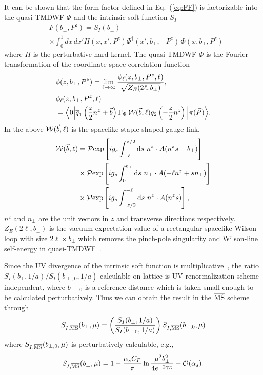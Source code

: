 It can be shown that the form factor defined in Eq.~(\ref{eq:FF}) is factorizable into the quasi-TMDWF $\Phi$ and the intrinsic soft function $S_I$~\cite{Ji:2019sxk,Ji:2020ect}
%
\begin{align}\label{eq:FF_factorization}
&F(b_\perp,P^z)= {S_I(b_\perp)}\\ &\times {\int_0^1 dx\, dx' H(x,x',P^z)\Phi^{\dagger}(x',b_\perp,-P^z)\, \Phi(x,b_\perp,P^z)}\nonumber
\end{align}
where $H$ is {the} perturbative hard kernel.
%
The quasi-TMDWF $ \Phi$ is the Fourier transformation of the coordinate-space correlation function
\begin{align}
\label{eq:phi_def}
&\phi(z,b_\perp,P^z)=\lim_{\ell\to\infty}\frac{\phi_\ell(z,b_\perp,P^z,\ell)}{\sqrt{Z_E(2\ell,b_\perp)}},\\
&\phi_\ell(z,b_\perp,P^z,\ell)\nonumber\\
&=\Big\langle 0\Big|\overline q_1\left(\frac{z }{2}n^z +\vec b\right)\Gamma_\Phi\,{\cal W}(\vec b,\ell)q_2\left(-\frac{z}{2}n^z \right)\Big| {\pi(\vec{P})}\Big\rangle\nonumber. 
\end{align}
In the above ${\cal W}(\vec b,\ell)$ is the spacelike staple-shaped gauge link,
\begin{align}
{\cal W}(\vec b,\ell)&= {\cal P}{\rm exp} \left[ ig_s\int_{-\ell}^{z/2} \textrm{d}s\ n^z\cdot  A(n^z s+b_\perp)\right] \nonumber\\
& \times {\cal P}{\rm exp} \left[ ig_s\int_{0}^{b_\perp } \textrm{d}s\ n_\perp\cdot  A(-\ell n^z +s  n_\perp)\right] \nonumber\\
& \times {\cal P}{\rm exp} \left[ ig_s\int_{-z/2}^{-\ell} \textrm{d}s\ n^z\cdot  A(n^z s)\right],
\end{align}
$n^z$ and $n_\perp$ are the unit vectors in $z$ and  transverse directions respectively. 
$Z_E(2\ell,b_\perp)$ is the vacuum expectation value of a rectangular spacelike Wilson loop with size $2\ell \times b_\perp$ which   removes the pinch-pole singularity and Wilson-line self-energy in quasi-TMDWF~\cite{Ji:2019sxk}.

Since the UV divergence of the intrinsic soft function is multiplicative~\cite{Ji:2020ect},
the  ratio  $S_I(b_{\perp},1/a)/S_I(b_{\perp,0},1/a)$ calculable on lattice is UV
renormalization-scheme independent, where $b_{\perp,0}$ is a reference distance which is taken
small enough to be calculated perturbatively. Thus we
can obtain the result in the $\overline{\rm MS}$ scheme
through
\begin{align}\label{eq:S_ratio}
S_{I,\overline{\rm MS}}(b_\perp,\mu)= \left(\frac{S_I(b_{\perp},1/a)}{S_I(b_{\perp,0},1/a)}\right)S_{I,\overline{\rm MS}}(b_{\perp,0},\mu)
\end{align}
where $S_{I,\overline{\rm MS}}(b_{\perp,0},\mu)$ is perturbatively calculable, e.g.,
\begin{align}\label{eq:S_ratio_1loop}
S_{I,\overline{\rm MS}}(b_{{\perp}},\mu)=1-\frac{\alpha_sC_F}{\pi}\ln\frac{\mu^2 b_{{\perp}}^2}{4 e^{-2\gamma_E}}+{\cal O}(\alpha_s).
\end{align}

